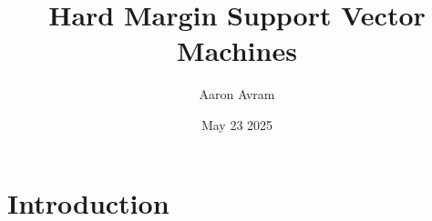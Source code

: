\documentclass[12pt]{article}
\title{Hard Margin Support Vector Machines}
\author{Aaron Avram}
\date{May 23 2025}
\begin{document}
\maketitle

\section*{Introduction}
\end{document}
